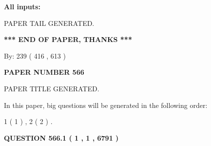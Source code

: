 \documentclass[12pt]{article}
\begin{document}
   
   
   
\noindent{}
   
   
   
   
\noindent\vspace{0.1in}\hspace{-0.08in} {\textbf{\Large{All inputs: }}}
   
   
   
   
   
   
 \vspace{0.2in}
 
   
   
\vspace{2.0in} PAPER TAIL GENERATED.
   
   
   
   
\vspace{1.0in} 
{\textbf{\large{ *** END OF PAPER, THANKS *** }}} 
   
   
\hspace{1.0in} By: 
 239 ( 416 ,  613 )
   
   
   
   
\newpage 
\setcounter{page}{ 
   566001 } 
   
   
   
   
 {\textbf{ \Large{ PAPER NUMBER  566  }}}
   
   
\vspace{0.2in}
   
   
   
   
   
   
   
   
 \vspace{0.2in}
 
 
 
 
   
   
 PAPER TITLE GENERATED.
   
   
   
\vspace{0.2in}
   
In this paper, big questions will be generated in the following order: 
   
   
   1 ( 1 )
 ,
   2 ( 2 )
 .
  
\vspace{0.2in}
  
{\textbf{\Large{QUESTION
566.1 
 ( 1 , 1 , 6791 )
}}}
  
\end{document}
